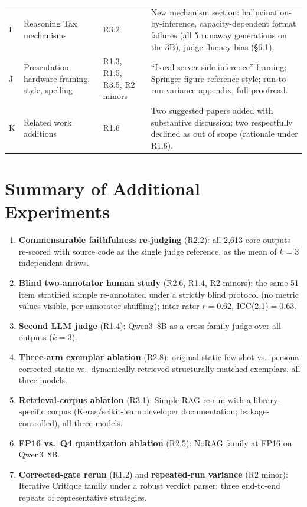 \documentclass[11pt]{article}
\begin{document}
\begin{center}
\begin{tabular}{p{0.4cm}p{3.6cm}p{2.4cm}p{7.6cm}}
I & Reasoning Tax mechanisms & R3.2 & New mechanism section: hallucination-by-inference, capacity-dependent format failures (all 5 runaway generations on the 3B), judge fluency bias (\S6.1). \\
J & Presentation: hardware framing, style, spelling & R1.3, R1.5, R3.5, R2 minors & ``Local server-side inference'' framing; Springer figure-reference style; run-to-run variance appendix; full proofread. \\
K & Related work additions & R1.6 & Two suggested papers added with substantive discussion; two respectfully declined as out of scope (rationale under R1.6). \\
\bottomrule
\end{tabular}
\end{center}

\section{Summary of Additional Experiments}
\label{sec:newexp}

\begin{enumerate}[leftmargin=1.4em]
  \item \textbf{Commensurable faithfulness re-judging} (R2.2): all 2{,}613 core outputs re-scored with source code as the single judge reference, as the mean of $k{=}3$ independent draws.
  \item \textbf{Blind two-annotator human study} (R2.6, R1.4, R2 minors): the same 51-item stratified sample re-annotated under a strictly blind protocol (no metric values visible, per-annotator shuffling); inter-rater $r=0.62$, ICC(2,1)$=0.63$.
  \item \textbf{Second LLM judge} (R1.4): Qwen3~8B as a cross-family judge over all outputs ($k{=}3$).
  \item \textbf{Three-arm exemplar ablation} (R2.8): original static few-shot vs.\ persona-corrected static vs.\ dynamically retrieved structurally matched exemplars, all three models.
  \item \textbf{Retrieval-corpus ablation} (R3.1): Simple RAG re-run with a library-specific corpus (Keras/scikit-learn developer documentation; leakage-controlled), all three models.
  \item \textbf{FP16 vs.\ Q4 quantization ablation} (R2.5): NoRAG family at FP16 on Qwen3~8B.
  \item \textbf{Corrected-gate rerun} (R1.2) and \textbf{repeated-run variance} (R2 minor): Iterative Critique family under a robust verdict parser; three end-to-end repeats of representative strategies.
\end{enumerate}
\end{document}
